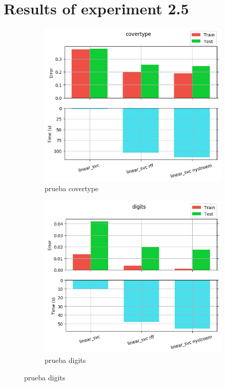 
\chapter{Results of experiment 2.5} %

\label{Appendix2-5} %

\begin{figure}[ht]
  \centering
  \begin{subfigure}[b]{0.5\linewidth}
    \centering\includegraphics[width=\imgscale\linewidth]{Figures/2_5/covertype}
    \caption{prueba covertype}
    \label{fig:2_5_covertype}
  \end{subfigure}%
  \begin{subfigure}[b]{0.5\linewidth}
    \centering\includegraphics[width=\imgscale\linewidth]{Figures/2_5/digits}
    \caption{prueba digits}
    \label{fig:2_5_digits}
  \end{subfigure}
\end{figure}


